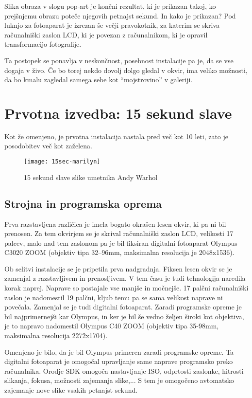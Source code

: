Slika obraza v slogu pop-art je končni rezultat, ki je prikazan takoj, ko
prejšnjemu obrazu poteče njegovih petnajst sekund. In kako je prikazan? Pod
luknjo za fotoaparat je izrezan še večji pravokotnik, za katerim se skriva
računalniški zaslon LCD, ki je povezan z računalnikom, ki je opravil
transformacijo fotografije.

Ta postopek se ponavlja v neskončnost, posebnost instalacije pa je, da se vse
dogaja v živo. Če bo torej nekdo dovolj dolgo gledal v okvir, ima veliko
možnosti, da bo kmalu zagledal samega sebe kot ``mojstrovino'' v galeriji.


\chapter{Prvotna izvedba: 15 sekund slave}
\label{ch:prvotnaIzvedba15}
Kot že omenjeno, je prvotna instalacija nastala pred več kot 10 leti, zato je
posodobitev več kot zaželena.

\begin{figure}[!ht]
    \centering
    \texttt{[image: 15sec-marilyn]}
    \caption{15 sekund slave slike umetnika Andy Warhol}
    \label{fig:15sec-marilyn}
\end{figure}

\section{Strojna in programska oprema}
\label{sec:strojnaProgramska15}
Prva razstavljena različica je imela bogato okrašen lesen okvir, ki pa ni bil
prenosen. Za tem okvirjem se je skrival računalniški zaslon LCD, velikosti 17
palcev, malo nad tem zaslonom pa je bil fiksiran digitalni fotoaparat Olympus
C3020 ZOOM (objektiv tipa 32–96mm, maksimalna resolucija je 2048x1536).

Ob selitvi instalacije se je pripetila prva nadgradnja. Fiksen lesen okvir se je
zamenjal z razstavljivem in prenosljivem. V tem času je tudi
tehnologija naredila korak naprej. Naprave so postajale vse manjše in
močnejše. 17 palčni računalniški zaslon je nadomestil 19 palčni, kljub temu pa
se sama velikost naprave ni povečala. Zamenjal se je tudi digitalni
fotoaparat. Zaradi programske opreme je bil najprimernejši kar Olympus, in ker
je bil še vedno željen široki kot objektiva, je to napravo nadomestil Olympus
C40 ZOOM (objektiv tipa 35-98mm, maksimalna resolucija 2272x1704).

Omenjeno je bilo, da je bil Olympus primeren zaradi programske opreme. Ta
digitalni fotoaparat je omogočal upravljanje same naprave programsko preko
računalnika. Orodje SDK omogoča nastavljanje ISO, odprtosti zaslonke, hitrosti
slikanja, fokusa, možnosti zajemanja slike,... S tem je o\-mo\-go\-če\-no avtomatsko
zajemanje nove slike vsakih petnajst sekund.


